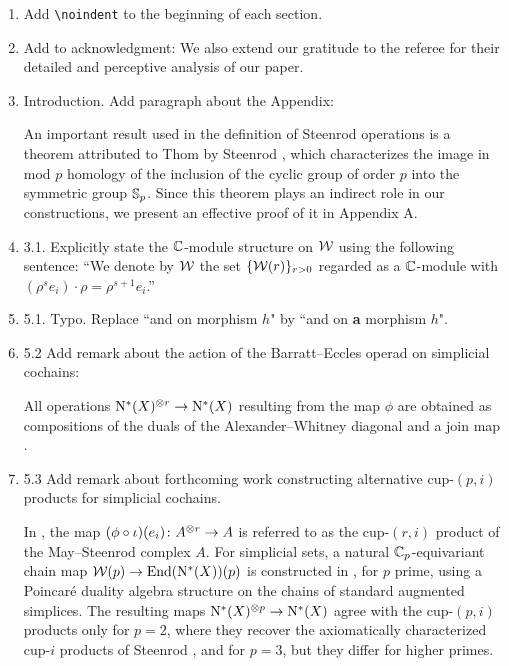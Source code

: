 \documentclass{amsart}
\begin{document}
\begin{enumerate}
	\item Add \verb|\noindent| to the beginning of each section.

	\item Add to acknowledgment: We also extend our gratitude to the referee for their detailed and perceptive analysis of our paper.

	\item Introduction. Add paragraph about the Appendix:

	\medskip An important result used in the definition of Steenrod operations is a theorem attributed to Thom by Steenrod \cite{steenrod1953cyclic}, which characterizes the image in mod $p$ homology of the inclusion of the cyclic group of order $p$ into the symmetric group $\mathbb{S}_p$.
	Since this theorem plays an indirect role in our constructions, we present an effective proof of it in Appendix A.

	\item 3.1. Explicitly state the $\mathbb{C}$-module structure on $\mathcal{W}$ using the following sentence:
	``We denote by $\mathcal{W}$ the set $\{\mathcal{W}(r)\}_{r > 0}$ regarded as a $\mathbb{C}$-module with $(\rho^s e_i) \cdot \rho = \rho^{s+1} e_i$.''

	\item 5.1. Typo. Replace ``and on morphism $h$" by ``and on \textbf{a} morphism $h$".

	\item 5.2 Add remark about the action of the Barratt--Eccles operad on simplicial cochains:

	\begin{remark*}
		All operations $\operatorname{N^{\ast}}(X)^{\otimes r} \to \operatorname{N^{\ast}}(X)$ resulting from the map $\phi$ are obtained as compositions of the duals of the Alexander--Whitney diagonal and a join map \cite{medina2020prop1, medina2021prop2}.
	\end{remark*}

	\item 5.3 Add remark about forthcoming work constructing alternative cup-$(p,i)$ products for simplicial cochains.

	\begin{remark*}
		In \cite{medina2021may_st}, the map $(\phi \mathbin{\circ} \iota)(e_i) \colon A^{\otimes r} \to A$ is referred to as the cup-$(r,i)$ product of the May--Steenrod complex $A$.
		For simplicial sets, a natural $\mathbb{C}_p$-equivariant chain map $\mathcal{W}(p) \to \mathrm{End}(\operatorname{N^{\ast}}(X))(p)$ is constructed in \cite{medina2024connected}, for $p$ prime, using a Poincar\'e duality algebra structure on the chains of standard augmented simplices.
		The resulting maps $\operatorname{N^{\ast}}(X)^{\otimes p} \to \operatorname{N^{\ast}}(X)$ agree with the cup-$(p,i)$ products only for $p=2$, where they recover the axiomatically characterized cup-$i$ products of Steenrod \cite{steenrod1947products, medina2023fast_sq, medina2022axiomatic}, and for $p=3$, but they differ for higher primes.
	\end{remark*}
\end{enumerate}
\end{document}

